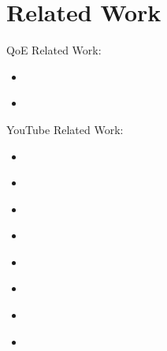 
\section{Related Work}
\label{sec:relatedwork}

QoE Related Work:

\begin{itemize}
\item \cite{casas2012youtube}
\item \cite{sieber16sacrificing,sieber15costaggressive}
\end{itemize}

YouTube Related Work:

\begin{itemize}
\item \cite{Anorga2015}
\item \cite{Yao2014b}
\item \cite{liu2013comparative}
\item \cite{Mansy2014}
\item \cite{nam2013mobile}
\item \cite{rao2011network}
\item \cite{ito14networklevel}
\item \cite{alcock11application}
\end{itemize}